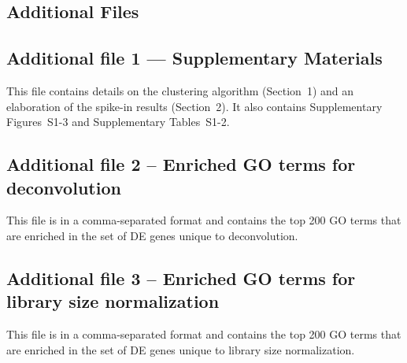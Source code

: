 \documentclass{bmcart}
\newcommand{\suppclustering}{1}
\newcommand{\suppspikesec}{2}
\begin{document}
\begin{backmatter}
\section*{Additional Files}
\subsection*{Additional file 1 --- Supplementary Materials}
This file contains details on the clustering algorithm (Section~\suppclustering{}) and an elaboration of the spike-in results (Section~\suppspikesec{}).
It also contains Supplementary Figures~S1-3 and Supplementary Tables~S1-2.

\subsection*{Additional file 2 -- Enriched GO terms for deconvolution}
This file is in a comma-separated format and contains the top 200 GO terms that are enriched in the set of DE genes unique to deconvolution.

\subsection*{Additional file 3 -- Enriched GO terms for library size normalization}
This file is in a comma-separated format and contains the top 200 GO terms that are enriched in the set of DE genes unique to library size normalization.

\end{backmatter}
\end{document}
